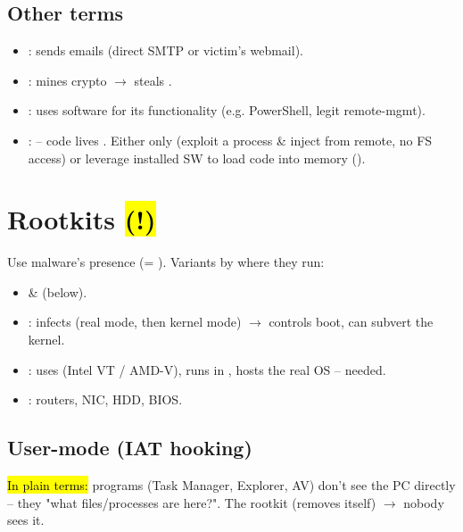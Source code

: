 \subsection{Other terms}
\begin{itemize}
\item {}: sends emails (direct SMTP or victim's webmail).
\item {}: mines crypto $\to$ steals .
\item {}: uses  software for its functionality (e.g. PowerShell, legit remote-mgmt).
\item {}:  -- code lives . Either  only (exploit a process \& inject from remote, no FS access) or leverage installed SW to load code into memory ().
\end{itemize}

\section{Rootkits \hl{(!)}}
Use  malware's presence (= ). Variants by where they run:
\begin{itemize}
\item {} \&  (below).
\item {}: infects  (real mode, then kernel mode) $\to$ controls boot, can subvert the kernel.
\item {}: uses  (Intel VT / AMD-V), runs in , hosts the real OS  --  needed.
\item {}: routers, NIC, HDD, BIOS.
\end{itemize}

\subsection{User-mode (IAT hooking)}
\hl{In plain terms:} programs (Task Manager, Explorer, AV) don't see the PC directly -- they  "what files/processes are here?". The rootkit  (removes itself) $\to$ nobody sees it.

